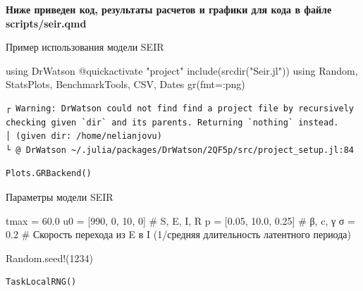 \documentclass[
  12pt,
  a4paper,
  DIV=11,
  numbers=noendperiod]{scrreprt}
\newenvironment{Shaded}{\begin{snugshade}}{\end{snugshade}}
\newcommand{\BuiltInTok}[1]{\textcolor[rgb]{0.00,0.23,0.31}{#1}}
\newcommand{\CommentTok}[1]{\textcolor[rgb]{0.37,0.37,0.37}{#1}}
\newcommand{\FloatTok}[1]{\textcolor[rgb]{0.68,0.00,0.00}{#1}}
\newcommand{\FunctionTok}[1]{\textcolor[rgb]{0.28,0.35,0.67}{#1}}
\newcommand{\ImportTok}[1]{\textcolor[rgb]{0.00,0.46,0.62}{#1}}
\newcommand{\NormalTok}[1]{\textcolor[rgb]{0.00,0.23,0.31}{#1}}
\newcommand{\OperatorTok}[1]{\textcolor[rgb]{0.37,0.37,0.37}{#1}}
\newcommand{\PreprocessorTok}[1]{\textcolor[rgb]{0.68,0.00,0.00}{#1}}
\newcommand{\StringTok}[1]{\textcolor[rgb]{0.13,0.47,0.30}{#1}}
\begin{document}
\textbf{Ниже приведен код, результаты расчетов и графики для кода в
файле scripts/seir.qmd}

Пример использования модели SEIR

\begin{Shaded}
\begin{Highlighting}[]
\ImportTok{using} \BuiltInTok{DrWatson}
\PreprocessorTok{@quickactivate} \StringTok{"project"}
\FunctionTok{include}\NormalTok{(}\FunctionTok{srcdir}\NormalTok{(}\StringTok{"Seir.jl"}\NormalTok{))}
\ImportTok{using} \BuiltInTok{Random}\NormalTok{, }\BuiltInTok{StatsPlots}\NormalTok{, }\BuiltInTok{BenchmarkTools}\NormalTok{, }\BuiltInTok{CSV}\NormalTok{, }\BuiltInTok{Dates}
\FunctionTok{gr}\NormalTok{(fmt}\OperatorTok{=:}\NormalTok{png)}
\end{Highlighting}
\end{Shaded}

\begin{verbatim}
┌ Warning: DrWatson could not find find a project file by recursively checking given `dir` and its parents. Returning `nothing` instead.
│ (given dir: /home/nelianjovu)
└ @ DrWatson ~/.julia/packages/DrWatson/2QF5p/src/project_setup.jl:84
\end{verbatim}

\begin{verbatim}
Plots.GRBackend()
\end{verbatim}

Параметры модели SEIR

\begin{Shaded}
\begin{Highlighting}[]
\NormalTok{tmax }\OperatorTok{=} \FloatTok{60.0}
\NormalTok{u0 }\OperatorTok{=}\NormalTok{ [}\FloatTok{990}\NormalTok{, }\FloatTok{0}\NormalTok{, }\FloatTok{10}\NormalTok{, }\FloatTok{0}\NormalTok{]  }\CommentTok{\# S, E, I, R}
\NormalTok{p }\OperatorTok{=}\NormalTok{ [}\FloatTok{0.05}\NormalTok{, }\FloatTok{10.0}\NormalTok{, }\FloatTok{0.25}\NormalTok{]  }\CommentTok{\# β, c, γ}
\NormalTok{σ }\OperatorTok{=} \FloatTok{0.2}  \CommentTok{\# Скорость перехода из E в I (1/средняя длительность латентного периода)}

\BuiltInTok{Random}\NormalTok{.}\FunctionTok{seed!}\NormalTok{(}\FloatTok{1234}\NormalTok{)}
\end{Highlighting}
\end{Shaded}

\begin{verbatim}
TaskLocalRNG()
\end{verbatim}
\end{document}
